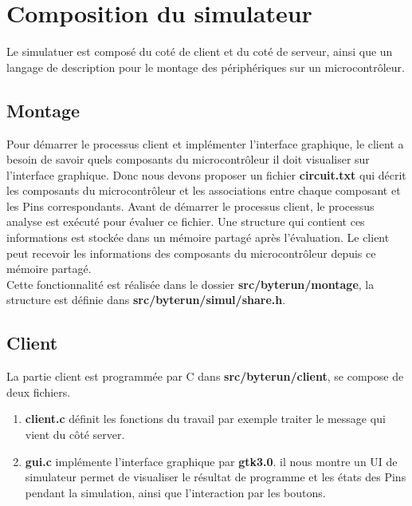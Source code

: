 \documentclass[14px]{article}
\begin{document}
\clearpage
\pagestyle{fancy}
\rhead{\thepage}
\fancyfoot{}
\section{Composition du simulateur}
Le simulatuer est composé du coté de client et du coté de serveur, ainsi que un langage de description pour le montage des périphériques sur un microcontrôleur.

\subsection{Montage}
Pour démarrer le processus client et implémenter l'interface graphique, le client a besoin de savoir quels composants du microcontrôleur il doit visualiser sur l'interface graphique. Donc
nous devons proposer un fichier \textbf{circuit.txt} qui décrit les composants du microcontrôleur et les associations entre chaque composant et les Pins correspondants. Avant de démarrer le processus client, le processus analyse est exécuté pour évaluer ce fichier. Une structure qui contient ces informations est stockée dans un mémoire partagé après l'évaluation. Le client peut recevoir les informations des composants du microcontrôleur depuis ce mémoire partagé.\\
Cette fonctionnalité est réalisée dans le dossier \textbf{src/byterun/montage}, la structure est définie dans \textbf{src/byterun/simul/share.h}.

\subsection{Client}
La partie client est programmée par C dans \textbf{src/byterun/client}, se compose de deux fichiers.
\begin{enumerate}
\item \textbf{client.c} définit les fonctions du travail par exemple traiter le message qui vient du côté server.

\item \textbf{gui.c} implémente l'interface graphique par \textbf{gtk3.0}.
il nous montre un UI de simulateur permet de visualiser le résultat de programme et les états des Pins pendant la simulation, ainsi que l'interaction par les boutons.\\
\end{enumerate}
\end{document}
